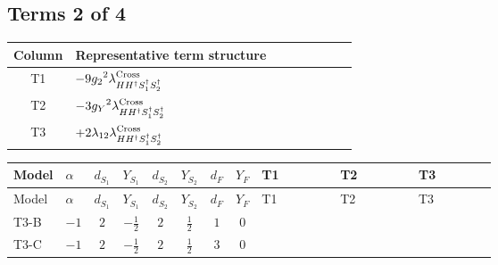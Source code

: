 \documentclass[8pt]{article}
\begin{document}
\begin{landscape}
\subsection*{Terms 2 of 4}
\begin{center}
\begin{tabular}{@{}c >{\raggedright\arraybackslash}p{0.82\linewidth}@{}}
\toprule
Column & Representative term structure \\
\midrule
T1 & \(\displaystyle -9 {g_2}^2 {\lambda_{H H^\dagger S_1^\dagger S_2^\dagger}^{\rm Cross}}\) \\
\midrule
T2 & \(\displaystyle -3 {g_Y}^2 {\lambda_{H H^\dagger S_1^\dagger S_2^\dagger}^{\rm Cross}}\) \\
\midrule
T3 & \(\displaystyle +2 {\lambda_{12}} {\lambda_{H H^\dagger S_1^\dagger S_2^\dagger}^{\rm Cross}}\) \\
\midrule
\bottomrule
\end{tabular}
\end{center}
\smallskip
\tiny
\begin{longtable}{@{}llcccccc >{\raggedright\arraybackslash}p{0.21\linewidth} >{\raggedright\arraybackslash}p{0.21\linewidth} >{\raggedright\arraybackslash}p{0.21\linewidth}@{}}
\toprule
Model & $\alpha$ & $d_{S_1}$ & $Y_{S_1}$ & $d_{S_2}$ & $Y_{S_2}$ & $d_F$ & $Y_F$ & T1 & T2 & T3 \\
\midrule
\endfirsthead
\toprule
Model & $\alpha$ & $d_{S_1}$ & $Y_{S_1}$ & $d_{S_2}$ & $Y_{S_2}$ & $d_F$ & $Y_F$ & T1 & T2 & T3 \\
\midrule
\endhead
T3-B & $-1$ & $2$ & $-\frac{1}{2}$ & $2$ & $\frac{1}{2}$ & $1$ & $0$ & \scriptsize\adjustbox{max width=\linewidth}{$\begin{gathered} -9 {g_2}^2 {\lambda_{H H^\dagger S_1^\dagger S_2^\dagger}^{\rm Cross}}\end{gathered}$} & \scriptsize\adjustbox{max width=\linewidth}{$\begin{gathered} -3 {g_Y}^2 {\lambda_{H H^\dagger S_1^\dagger S_2^\dagger}^{\rm Cross}}\end{gathered}$} & \scriptsize\adjustbox{max width=\linewidth}{$\begin{gathered} +2 {\lambda_{12}} {\lambda_{H H^\dagger S_1^\dagger S_2^\dagger}^{\rm Cross}}\end{gathered}$} \\
\midrule
T3-C & $-1$ & $2$ & $-\frac{1}{2}$ & $2$ & $\frac{1}{2}$ & $3$ & $0$ & \scriptsize\adjustbox{max width=\linewidth}{$\begin{gathered} -9 {g_2}^2 {\lambda_{H H^\dagger S_1^\dagger S_2^\dagger}^{\rm Cross}}\end{gathered}$} & \scriptsize\adjustbox{max width=\linewidth}{$\begin{gathered} -3 {g_Y}^2 {\lambda_{H H^\dagger S_1^\dagger S_2^\dagger}^{\rm Cross}}\end{gathered}$} & \scriptsize\adjustbox{max width=\linewidth}{$\begin{gathered} +2 {\lambda_{12}} {\lambda_{H H^\dagger S_1^\dagger S_2^\dagger}^{\rm Cross}}\end{gathered}$} \\

\end{longtable}
\end{landscape}
\end{document}
